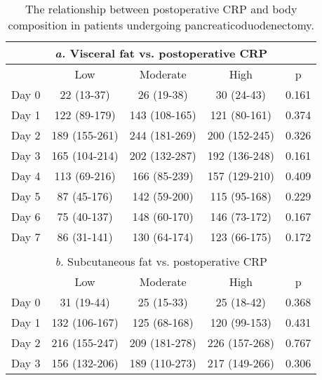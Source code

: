 \begin{table}[p]
	\caption{The relationship  between postoperative CRP and body composition in patients undergoing pancreaticoduodenectomy. }
	\label{table:sirs_bodycomp_crp}
	\centering
	\renewcommand{\arraystretch}{1.2} %
	\setlength{\tabcolsep}{9pt} %
	
	\begin{tabular}{|l c c c c |}
		        \multicolumn{5}{c}{\textit{a.} Visceral fat vs. postoperative CRP}         \\ \hline
		      & Low           & Moderate      & High          & p                          \\
		Day 0 & 22 (13-37)    & 26 (19-38)    & 30 (24-43)    & 0.161                      \\
		Day 1 & 122 (89-179)  & 143 (108-165) & 121 (80-161)  & 0.374                      \\
		Day 2 & 189 (155-261) & 244 (181-269) & 200 (152-245) & 0.326                      \\
		Day 3 & 165 (104-214) & 202 (132-287) & 192 (136-248) & 0.161                      \\
		Day 4 & 113 (69-216)  & 166 (85-239)  & 157 (129-210) & 0.409                      \\
		Day 5 & 87 (45-176)   & 142 (59-200)  & 115 (95-168)  & 0.229                      \\
		Day 6 & 75 (40-137) & 148 (60-170)  & 146 (73-172)  & 0.167                      \\
		Day 7 & 86 (31-141)   & 130 (64-174)  & 123 (66-175)  & 0.172                      \\ \hline
		                               \multicolumn{5}{c}{}                                \\
		      \multicolumn{5}{c}{\textit{b.} Subcutaneous fat vs. postoperative CRP}       \\ \hline
		      & Low           & Moderate      & High          & p                          \\
		Day 0 & 31 (19-44)    & 25 (15-33)    & 25 (18-42)    & 0.368                      \\
		Day 1 & 132 (106-167) & 125 (68-168)  & 120 (99-153)  & 0.431                      \\
		Day 2 & 216 (155-247) & 209 (181-278) & 226 (157-268) & 0.767                      \\
		Day 3 & 156 (132-206) & 189 (110-273) & 217 (149-266) & 0.306                      \\

\end{tabular}
\end{table}
